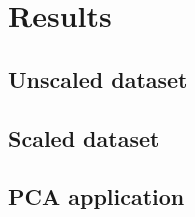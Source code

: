 \section{Results}
\subsection{Unscaled dataset}
\subsection{Scaled dataset}
\subsection{PCA application}